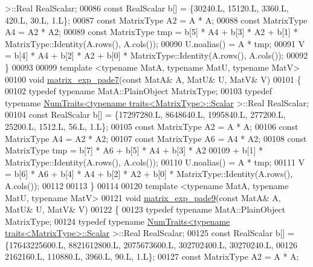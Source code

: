 \begin{DoxyCode}
      >::Real RealScalar;
00086   \textcolor{keyword}{const} RealScalar b[] = \{30240.L, 15120.L, 3360.L, 420.L, 30.L, 1.L\};
00087   \textcolor{keyword}{const} MatrixType A2 = A * A;
00088   \textcolor{keyword}{const} MatrixType A4 = A2 * A2;
00089   \textcolor{keyword}{const} MatrixType tmp = b[5] * A4 + b[3] * A2 + b[1] * MatrixType::Identity(A.rows(), A.cols());
00090   U.noalias() = A * tmp;
00091   V = b[4] * A4 + b[2] * A2 + b[0] * MatrixType::Identity(A.rows(), A.cols());
00092 \}
00093 
00099 \textcolor{keyword}{template} <\textcolor{keyword}{typename} MatA, \textcolor{keyword}{typename} MatU, \textcolor{keyword}{typename} MatV>
00100 \textcolor{keywordtype}{void} \hyperlink{namespace_eigen_1_1internal_a1abecb439e6cb1b5188828cdb7e0ab60}{matrix\_exp\_pade7}(\textcolor{keyword}{const} MatA& A, MatU& U, MatV& V)
00101 \{
00102   \textcolor{keyword}{typedef} \textcolor{keyword}{typename} MatA::PlainObject MatrixType;
00103   \textcolor{keyword}{typedef} \textcolor{keyword}{typename} \hyperlink{group___core___module_struct_eigen_1_1_num_traits}{NumTraits<typename traits<MatrixType>::Scalar}
      >::Real RealScalar;
00104   \textcolor{keyword}{const} RealScalar b[] = \{17297280.L, 8648640.L, 1995840.L, 277200.L, 25200.L, 1512.L, 56.L, 1.L\};
00105   \textcolor{keyword}{const} MatrixType A2 = A * A;
00106   \textcolor{keyword}{const} MatrixType A4 = A2 * A2;
00107   \textcolor{keyword}{const} MatrixType A6 = A4 * A2;
00108   \textcolor{keyword}{const} MatrixType tmp = b[7] * A6 + b[5] * A4 + b[3] * A2 
00109     + b[1] * MatrixType::Identity(A.rows(), A.cols());
00110   U.noalias() = A * tmp;
00111   V = b[6] * A6 + b[4] * A4 + b[2] * A2 + b[0] * MatrixType::Identity(A.rows(), A.cols());
00112 
00113 \}
00114 
00120 \textcolor{keyword}{template} <\textcolor{keyword}{typename} MatA, \textcolor{keyword}{typename} MatU, \textcolor{keyword}{typename} MatV>
00121 \textcolor{keywordtype}{void} \hyperlink{namespace_eigen_1_1internal_a218447e97bf869bf354f92e020a7355a}{matrix\_exp\_pade9}(\textcolor{keyword}{const} MatA& A, MatU& U, MatV& V)
00122 \{
00123   \textcolor{keyword}{typedef} \textcolor{keyword}{typename} MatA::PlainObject MatrixType;
00124   \textcolor{keyword}{typedef} \textcolor{keyword}{typename} \hyperlink{group___core___module_struct_eigen_1_1_num_traits}{NumTraits<typename traits<MatrixType>::Scalar}
      >::Real RealScalar;
00125   \textcolor{keyword}{const} RealScalar b[] = \{17643225600.L, 8821612800.L, 2075673600.L, 302702400.L, 30270240.L,
00126                           2162160.L, 110880.L, 3960.L, 90.L, 1.L\};
00127   \textcolor{keyword}{const} MatrixType A2 = A * A;

\end{DoxyCode}
